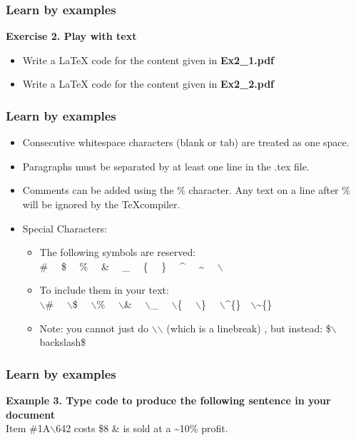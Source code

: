 \documentclass [9pt] {beamer}
\begin{document}
\begin{frame}\frametitle{Learn by examples}
\rm
\fontsize{9pt}{11pt}\selectfont

\textbf{Exercise 2. Play with text}\\[.30cm]
\begin{itemize}
	\item Write a LaTeX code for the content given in \textbf{Ex2\_1.pdf}
	\item Write a LaTeX code for the content given in \textbf{Ex2\_2.pdf}
	
\end{itemize}

\end{frame}


\begin{frame}\frametitle{Learn by examples}
\rm
\fontsize{9pt}{11pt}\selectfont
\begin{itemize}
  \item Consecutive whitespace characters (blank or tab) are treated as one space.\\[.30cm]
  \item Paragraphs must be separated by at least one line in the .tex file.\\[.30cm]
  \item Comments can be added using the \% character. Any text on a line after \% will be ignored by the \TeX compiler.
  \item Special Characters:
  \begin{itemize}
    \item The following symbols are reserved:\\
            \# \ \  \$ \ \  \% \ \  \& \ \  \_ \ \  \{ \ \  \} \ \  \^{} \ \  \~{} \ \  $\backslash$

    \item To include them in your text:\\
         $\backslash$\# \ \ $\backslash$\$ \ \ $\backslash$\% \ \ $\backslash$\& \ \ $\backslash$\_ \ \ $\backslash$\{ \ \ $\backslash$\} \ \  $\backslash$\^{}\{\}\ \  $\backslash$\~{}\{\}
%
   \item Note: you cannot just do $\backslash$$\backslash$ (which is a linebreak) , but instead:
       \$$\backslash$backslash\$

  \end{itemize}
\end{itemize}

\end{frame}

\begin{frame}\frametitle{Learn by examples}

\textbf{Example 3. Type code to produce the following sentence in your document}\\[.30cm]

Item \#1A$\backslash$642 costs \$8 \& is sold at a \~{}10\% profit.
\end{frame}
\end{document}
